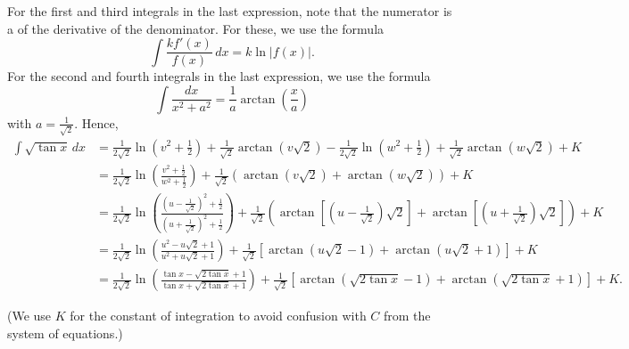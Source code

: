 \documentclass[12pt]{article}
\begin{document}
For the first and third integrals in the last expression, note that the numerator is a  of the derivative of the denominator.  For these, we use the formula
\[
\int\frac{kf'(x)}{f(x)} \, dx=k\ln|f(x)|.
\]
For the second and fourth integrals in the last expression, we use the formula
\[
\int\frac{dx}{x^2+a^2}=\frac{1}{a}\arctan\left(\frac{x}{a}\right)
\]
with $a=\frac{1}{\sqrt{2}}$.  Hence,
\begin{align*}
\int\sqrt{\tan x} \, dx & =\frac{1}{2\sqrt{2}}\ln\left(v^2+\frac{1}{2}\right)+\frac{1}{\sqrt{2}}\arctan(v\sqrt{2}) -\frac{1}{2\sqrt{2}}\ln\left(w^2+\frac{1}{2}\right)+\frac{1}{\sqrt{2}}\arctan(w\sqrt{2})+K \\
& =\frac{1}{2\sqrt{2}}\ln\left(\frac{v^2+\frac{1}{2}}{w^2+\frac{1}{2}}\right) +\frac{1}{\sqrt{2}}(\arctan(v\sqrt{2})+\arctan(w\sqrt{2}))+K \\
& =\frac{1}{2\sqrt{2}}\ln\left(\frac{(u-\frac{1}{\sqrt{2}})^2+\frac{1}{2}}{(u+\frac{1}{\sqrt{2}})^2+\frac{1}{2}}\right) +\frac{1}{\sqrt{2}}\left(\!\arctan\left[\!\left(\!u-\frac{1}{\sqrt{2}}\!\right)\!\sqrt{2}\right]\! +\!\arctan\left[\!\left(\!u+\frac{1}{\sqrt{2}}\!\right)\!\sqrt{2}\right]\!\right)\!+\!K \\
& =\frac{1}{2\sqrt{2}}\ln\left(\frac{u^2-u\sqrt{2}+1}{u^2+u\sqrt{2}+1}\right) +\frac{1}{\sqrt{2}}[\arctan(u\sqrt{2}-1)+\arctan(u\sqrt{2}+1)]+K \\
& =\frac{1}{2\sqrt{2}}\ln\left(\frac{\tan x-\sqrt{2\tan x}+1}{\tan x+\sqrt{2\tan x}+1}\right) +\frac{1}{\sqrt{2}}[\arctan(\sqrt{2\tan x}-1)+\arctan(\sqrt{2\tan x}+1)]+K.
\end{align*}

(We use $K$ for the constant of integration to avoid confusion with $C$ from the system of equations.)
\end{document}
